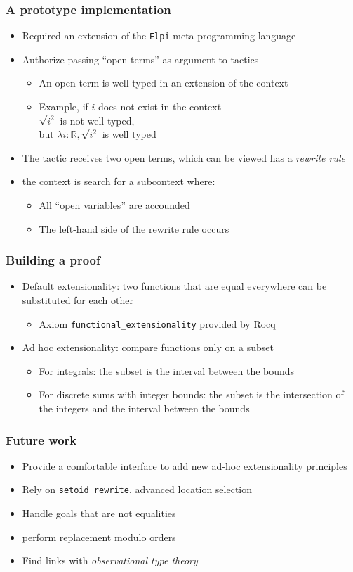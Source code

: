 \documentclass[compress]{beamer}
\begin{document}
\begin{frame}
\frametitle{A prototype implementation}
\begin{itemize}
\item Required an extension of the {\tt Elpi} meta-programming language
\item Authorize passing ``open terms'' as argument to tactics
\begin{itemize}
\item An open term is well typed in an extension of the context
\item Example, if \(i\) does not exist in the context\\
 \(\sqrt{i^2}\) is not well-typed,\\
 but \(\lambda i : {\mathbb R}, \sqrt{i^2}\) is well typed
\end{itemize}
\item The tactic receives two open terms, which can be viewed has a
{\em rewrite rule}
\item the context is search for a subcontext where:
\begin{itemize}
\item All ``open variables'' are accounded
\item The left-hand side of the rewrite rule occurs
\end{itemize}
\end{itemize}
\end{frame}
\begin{frame}
\frametitle{Building a proof}
\begin{itemize}
\item Default extensionality: two functions that are equal everywhere can
be substituted for each other
\begin{itemize}
\item Axiom {\tt functional\_extensionality} provided by Rocq
\end{itemize}
\item Ad hoc extensionality: compare functions only on a subset
\begin{itemize}
\item For integrals: the subset is the interval between the bounds
\item For discrete sums with integer bounds: the subset is the intersection
of the integers and the interval between the bounds
\end{itemize}
\end{itemize}
\end{frame}
\begin{frame}
\frametitle{Future work}
\begin{itemize}
\item Provide a comfortable interface to add new ad-hoc extensionality
principles
\item Rely on {\tt setoid rewrite}, advanced location selection
\item Handle goals that are not equalities
\item perform replacement modulo orders
\item Find links with {\em observational type theory}
\end{itemize}

\end{frame}
\end{document}
